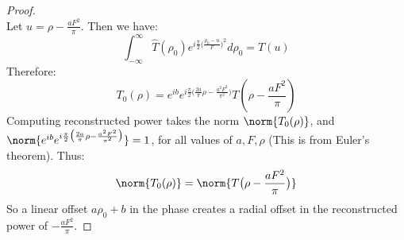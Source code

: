 \documentclass[crop=false,class=book,oneside]{standalone}
\begin{document}
\begin{proof}
\begin{equation*}
            \end{equation*}
            Let $u = \rho - \frac{aF^2}{\pi}$. Then we have:
            \begin{equation*}
            \int_{-\infty}^{\infty} \hat{T}(\rho_0)e^{i\frac{\pi}{2}\big(\frac{\rho_0 - u}{F}\big)^2}d\rho_0 = T(u)
            \end{equation*}
            Therefore:
            \begin{equation*}
            T_0(\rho) = e^{ib}e^{i\frac{\pi}{2}\big(\frac{2a}{\pi}\rho - \frac{a^2F^2}{\pi^2}\big)}T(\rho - \frac{aF^2}{\pi})
            \end{equation*}
            Computing reconstructed power takes the norm $\norm{T_{0}(\rho)}$, and $\norm{e^{ib}e^{i\frac{\pi}{2}\big(\frac{2a}{\pi}\rho - \frac{a^2F^2}{\pi^2}\big)}} = 1$, for all values of $a,F, \rho$ (This is from Euler's theorem). Thus:
            \begin{equation*}
                \norm{T_{0}(\rho)} = \norm{T\big(\rho - \frac{aF^2}{\pi}\big)}    
            \end{equation*}
            So a linear offset $a\rho_0+b$ in the phase creates a radial offset in the reconstructed power of $-\frac{aF^2}{\pi}$.
            \end{proof}
\end{document}
